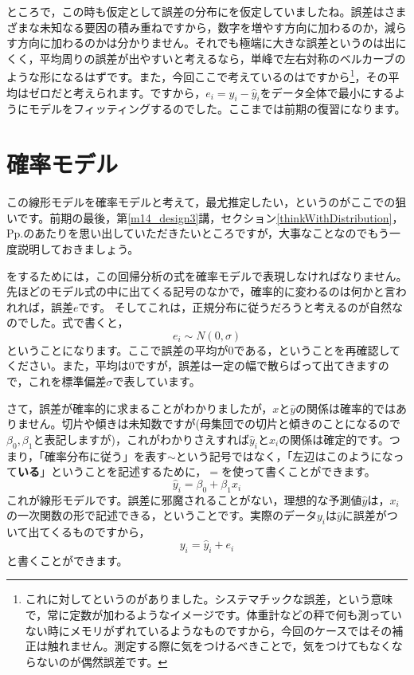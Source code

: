 \documentclass{ltjbook}
\begin{document}
ところで，この時も仮定として誤差の分布にを仮定していましたね。誤差はさまざまな未知なる要因の積み重ねですから，数字を増やす方向に加わるのか，減らす方向に加わるのかは分かりません。それでも極端に大きな誤差というのは出にくく，平均周りの誤差が出やすいと考えるなら，単峰で左右対称のベルカーブのような形になるはずです。また，今回ここで考えているのはですから\footnote{これに対してというのがありました。システマチックな誤差，という意味で，常に定数が加わるようなイメージです。体重計などの秤で何も測っていない時にメモリがずれているようなものですから，今回のケースではその補正は触れません。測定する際に気をつけるべきことで，気をつけてもなくならないのが偶然誤差です。}，その平均はゼロだと考えられます。ですから，$e_i = y_i - \hat{y}_i$をデータ全体で最小にするようにモデルをフィッティングするのでした。ここまでは前期の復習になります。

\section{確率モデル}
この線形モデルを確率モデルと考えて，最尤推定したい，というのがここでの狙いです。前期の最後，第\ref{m14_design3}講，セクション\ref{thinkWithDistribution}，Pp.\pageref{thinkWithDistribution}のあたりを思い出していただきたいところですが，大事なことなのでもう一度説明しておきましょう。

をするためには，この回帰分析の式を確率モデルで表現しなければなりません。先ほどのモデル式の中に出てくる記号のなかで，確率的に変わるのは何かと言われれば，誤差$e$です。
そしてこれは，正規分布に従うだろうと考えるのが自然なのでした。式で書くと，
\[ e_i \sim N(0,\sigma) \]
ということになります。ここで誤差の平均が0である，ということを再確認してください。また，平均は0ですが，誤差は一定の幅で散らばって出てきますので，これを標準偏差$\sigma$で表しています。

さて，誤差が確率的に求まることがわかりましたが，$x$と$\hat{y}$の関係は確率的ではありません。切片や傾きは未知数ですが(母集団での切片と傾きのことになるので$\beta_0,\beta_1$と表記しますが)，これがわかりさえすれば$\hat{y}_i$と$x_i$の関係は確定的です。つまり，「確率分布に従う」を表す$\sim$という記号ではなく，「左辺はこのようになって\textbf{いる}」ということを記述するために，$=$を使って書くことができます。
\[ \hat{y}_i = \beta_0 + \beta_1 x_i \]
これが線形モデルです。誤差に邪魔されることがない，理想的な予測値$\hat{y}$は，$x_i$の一次関数の形で記述できる，ということです。実際のデータ$y_i$は$\hat{y}$に誤差がついて出てくるものですから，
\[ y_i = \hat{y}_i + e_i  \]
と書くことができます。
\end{document}
